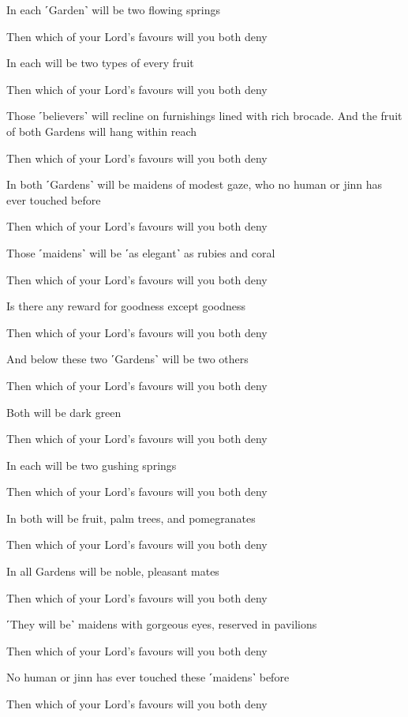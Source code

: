 In each ˹Garden˺ will be two flowing springs

Then which of your Lord’s favours will you both deny

In each will be two types of every fruit

Then which of your Lord’s favours will you both deny

Those ˹believers˺ will recline on furnishings lined with rich brocade. And the fruit of both Gardens will hang within reach

Then which of your Lord’s favours will you both deny

In both ˹Gardens˺ will be maidens of modest gaze, who no human or jinn has ever touched before

Then which of your Lord’s favours will you both deny

Those ˹maidens˺ will be ˹as elegant˺ as rubies and coral

Then which of your Lord’s favours will you both deny

Is there any reward for goodness except goodness

Then which of your Lord’s favours will you both deny

And below these two ˹Gardens˺ will be two others

Then which of your Lord’s favours will you both deny

Both will be dark green

Then which of your Lord’s favours will you both deny

In each will be two gushing springs

Then which of your Lord’s favours will you both deny

In both will be fruit, palm trees, and pomegranates

Then which of your Lord’s favours will you both deny

In all Gardens will be noble, pleasant mates

Then which of your Lord’s favours will you both deny

˹They will be˺ maidens with gorgeous eyes, reserved in pavilions

Then which of your Lord’s favours will you both deny

No human or jinn has ever touched these ˹maidens˺ before

Then which of your Lord’s favours will you both deny

